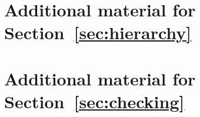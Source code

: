 \documentclass[acmsmall,review,anonymous,screen]{acmart}\settopmatter{printfolios=true,printccs=false,printacmref=true}
\begin{document}
\section{Additional material for Section~\ref{sec:hierarchy}}
\label{apx:hierarchy}


\section{Additional material for Section~\ref{sec:checking}}
\label{apx:checking}



\fi

\ifcomments


% 
% 
\fi
\end{document}
